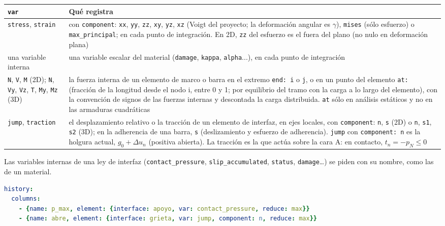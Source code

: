 \documentclass[11pt,oneside]{report}
\begin{document}
\begin{center}
\begin{tabularx}{\textwidth}{YY}
\hline
\textbf{\texttt{var}} & \textbf{Qué registra} \\
\hline
\texttt{stress}, \texttt{strain} & con \texttt{component}: \texttt{xx}, \texttt{yy}, \texttt{zz}, \texttt{xy}, \texttt{yz}, \texttt{xz} (Voigt del proyecto; la deformación angular es $\gamma$), \texttt{mises} (sólo esfuerzo) o \texttt{max\_principal}; en cada punto de integración. En 2D, \texttt{zz} del esfuerzo es el fuera del plano (no nulo en deformación plana) \\
una variable interna & una variable escalar del material (\texttt{damage}, \texttt{kappa}, \texttt{alpha}...), en cada punto de integración \\
\texttt{N}, \texttt{V}, \texttt{M} (2D); \texttt{N}, \texttt{Vy}, \texttt{Vz}, \texttt{T}, \texttt{My}, \texttt{Mz} (3D) & la fuerza interna de un elemento de marco o barra en el extremo \texttt{end: i} o \texttt{j}, o en un punto del elemento \texttt{at:} (fracción de la longitud desde el nodo i, entre 0 y 1; por equilibrio del tramo con la carga a lo largo del elemento), con la convención de signos de las fuerzas internas y descontada la carga distribuida. \texttt{at} sólo en análisis estáticos y no en las armaduras cuadráticas \\
\texttt{jump}, \texttt{traction} & el desplazamiento relativo o la tracción de un elemento de interfaz, en ejes locales, con \texttt{component}: \texttt{n}, \texttt{s} (2D) o \texttt{n}, \texttt{s1}, \texttt{s2} (3D); en la adherencia de una barra, \texttt{s} (deslizamiento y esfuerzo de adherencia). \texttt{jump} con \texttt{component: n} es la holgura actual, $g_0 + \Delta u_n$ (positiva abierta). La tracción es la que actúa sobre la cara A: en contacto, $t_n = -p_N \le 0$ \\
\hline
\end{tabularx}
\end{center}
Las variables internas de una ley de interfaz (\texttt{contact\_pressure}, \texttt{slip\_accumulated}, \texttt{status}, \texttt{damage}\ldots{}) se piden con su nombre, como las de un material.

\begin{lstlisting}[language=yaml]
history:
  columns:
    - {name: p_max, element: {interface: apoyo, var: contact_pressure, reduce: max}}
    - {name: abre, element: {interface: grieta, var: jump, component: n, reduce: max}}

\end{lstlisting}
\end{document}
